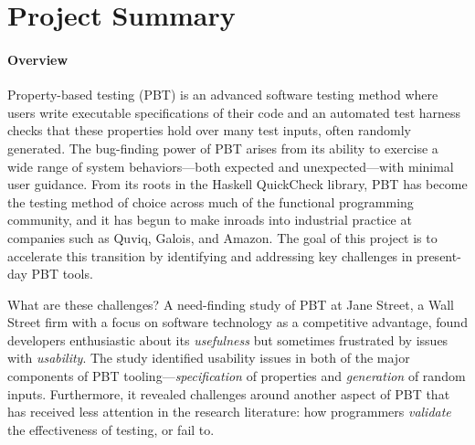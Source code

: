 \section*{Project Summary}

\paragraph*{Overview}
Property-based testing (PBT) is an advanced software testing
method where users write executable specifications of their code
and an automated test harness checks that these properties hold over
many test inputs, often randomly generated.  The bug-finding power of PBT arises
from its ability to exercise a wide range of system behaviors---both
expected and unexpected---with minimal user guidance.
%
From its roots in the Haskell QuickCheck library, PBT has become
the testing method of choice across much of the functional programming
community, and it has begun to make inroads into industrial practice
at companies such as Quviq, Galois, and Amazon.\iflater{}\fi{}
%
The goal of this project is to accelerate this transition
by identifying and addressing key challenges in
present-day PBT tools.

What are these challenges?
A need-finding study of PBT at Jane
Street, a Wall Street firm with a focus on software
technology as a competitive advantage, found developers enthusiastic
about its {\em usefulness} but
sometimes frustrated by issues with {\em usability}.
%
The study identified usability issues in both of the major components
of PBT tooling---{\em specification} of properties and {\em
  generation} of random inputs. Furthermore, it revealed challenges
around another aspect of PBT that has received less attention in the
research literature: how programmers {\em validate} the
effectiveness of testing, or fail to.



